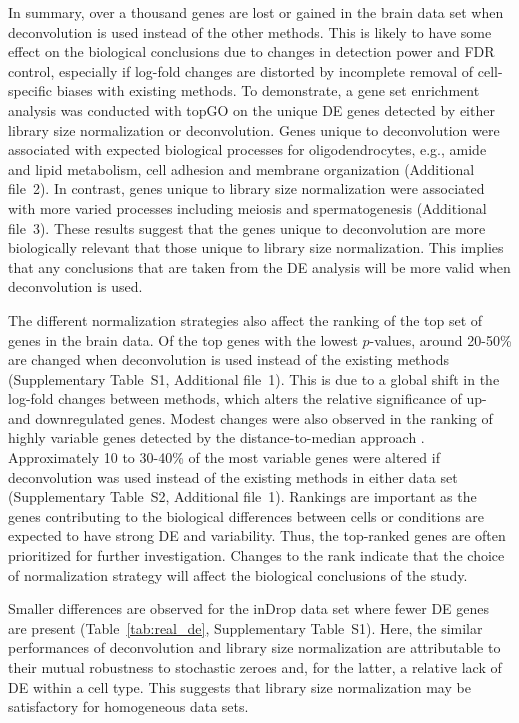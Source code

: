 \documentclass{bmcart}
\newcommand{\supprank}{S1}
\newcommand{\suppHVG}{S2}
\begin{document}
In summary, over a thousand genes are lost or gained in the brain data set when deconvolution is used instead of the other methods.
This is likely to have some effect on the biological conclusions due to changes in detection power and FDR control, 
    especially if log-fold changes are distorted by incomplete removal of cell-specific biases with existing methods.
To demonstrate, a gene set enrichment analysis was conducted with topGO \cite{alexa2010topgo} on the unique DE genes detected by either library size normalization or deconvolution.
Genes unique to deconvolution were associated with expected biological processes for oligodendrocytes, e.g., amide and lipid metabolism, cell adhesion and membrane organization (Additional file~2).
In contrast, genes unique to library size normalization were associated with more varied processes including meiosis and spermatogenesis (Additional file~3).
These results suggest that the genes unique to deconvolution are more biologically relevant that those unique to library size normalization.
This implies that any conclusions that are taken from the DE analysis will be more valid when deconvolution is used.

The different normalization strategies also affect the ranking of the top set of genes in the brain data.
Of the top genes with the lowest $p$-values, around 20-50\% are changed when deconvolution is used instead of the existing methods (Supplementary Table~\supprank{}, Additional file~1).
This is due to a global shift in the log-fold changes between methods, which alters the relative significance of up- and downregulated genes.
Modest changes were also observed in the ranking of highly variable genes detected by the distance-to-median approach \cite{kolod2015single}.
Approximately 10 to 30-40\% of the most variable genes were altered if deconvolution was used instead of the existing methods in either data set (Supplementary Table~\suppHVG{}, Additional file~1).
Rankings are important as the genes contributing to the biological differences between cells or conditions are expected to have strong DE and variability.
Thus, the top-ranked genes are often prioritized for further investigation.
Changes to the rank indicate that the choice of normalization strategy will affect the biological conclusions of the study.

Smaller differences are observed for the inDrop data set where fewer DE genes are present (Table~\ref{tab:real_de}, Supplementary Table~\supprank{}).
Here, the similar performances of deconvolution and library size normalization are attributable to their mutual robustness to stochastic zeroes and, for the latter, a relative lack of DE within a cell type.
This suggests that library size normalization may be satisfactory for homogeneous data sets.
\end{document}
